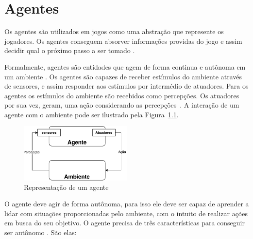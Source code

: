 \chapter{\label{chap:agentes}Agentes} 



Os agentes são utilizados em jogos como uma abstração que represente os jogadores. Os agentes conseguem absorver informações providas do jogo e assim decidir qual o próximo passo a ser tomado \cite{millington2009artificial}. 

Formalmente, agentes são entidades que agem de forma continua e autônoma em um ambiente \cite{agent1993oriented}. 
Os agentes são capazes de receber estímulos do ambiente através de sensores, e assim responder aos estímulos por intermédio de atuadores. 
Para os agentes os estímulos do ambiente são recebidos como percepções. 
Os atuadores por sua vez, geram, uma ação considerando as percepções~\cite{intelligence2003modern}. 
A interação de um agente com o ambiente pode ser ilustrado pela Figura~\ref{fig:agente}.

\begin{figure}[ht]
	\centering
	\includegraphics[width=0.5\textwidth]{fig/agente.pdf}
	\caption{Representação de um agente}
	\label{fig:agente}
\end{figure} 

O agente deve agir de forma autônoma, para isso ele deve ser capaz de aprender a lidar com situações proporcionadas pelo ambiente, com o intuito de realizar ações em busca do seu objetivo. O agente precisa de três características para conseguir ser autônomo \cite{agent1999}. São elas:
 
